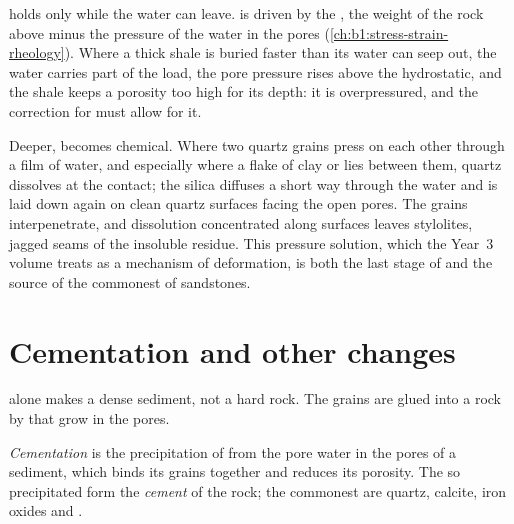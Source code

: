  holds only while the water can leave.  is driven by the
, the weight of the rock above minus the pressure of the water
in the pores (\cref{ch:b1:stress-strain-rheology}). Where a thick shale is buried
faster than its water can seep out, the water carries part of the load, the pore
pressure rises above the hydrostatic, and the shale keeps a porosity too high for
its depth: it is overpressured, and the correction for  must allow for
it.

Deeper,  becomes chemical. Where two quartz grains press on each
other through a film of water, and especially where a flake of clay or  lies
between them, quartz dissolves at the contact; the silica diffuses a short way
through the water and is laid down again on clean quartz surfaces facing the
open pores. The grains interpenetrate, and dissolution concentrated along
surfaces leaves stylolites, jagged seams of the insoluble residue. This pressure
solution, which the Year~3 volume treats as a mechanism of deformation, is both
the last stage of  and the source of the commonest  of
sandstones.

\section{Cementation and other changes}\label{sec:b1:diagenesis-basins:cementation}

 alone makes a dense sediment, not a hard rock. The grains are glued
into a rock by  that grow in the pores.

\begin{definition}\label{def:b1:diagenesis-basins:cement}
\emph{Cementation} is the precipitation of  from
the pore water in the pores of a sediment, which binds its grains together and
reduces its porosity. The  so precipitated form the
\emph{cement} of the rock; the commonest are quartz, calcite,
iron oxides and .
\end{definition}

